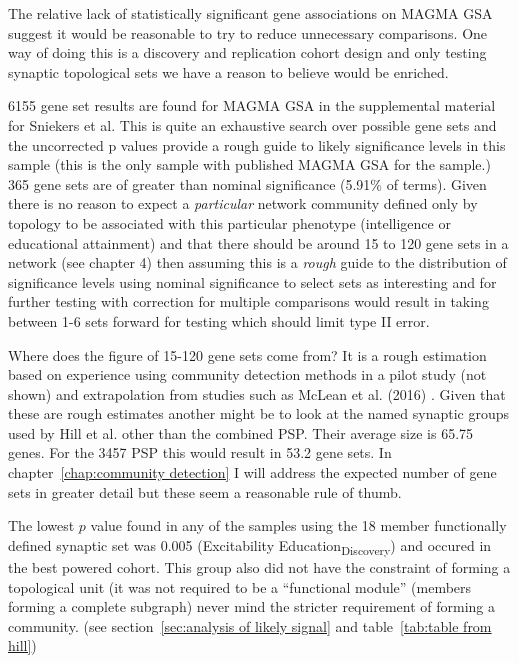 The relative lack of statistically significant gene associations on MAGMA GSA suggest it would be reasonable to try to reduce unnecessary comparisons. One way of doing this is a discovery and replication cohort design and only testing synaptic topological sets we have a reason to believe would be enriched. 

6155 gene set results are found for MAGMA GSA in the supplemental material for Sniekers et al\cite{sniekers2017genome}. This is quite an exhaustive search over possible gene sets and the uncorrected p values provide a rough guide to likely significance levels in this sample (this is the only sample with published MAGMA GSA for the sample.) 365 gene sets are of greater than nominal significance (5.91\% of terms). Given there is no reason to expect a \textit{particular} network community defined only by topology to be associated with this particular phenotype (intelligence or educational attainment) and that there should be around 15 to 120 gene sets in a network (see chapter 4) then assuming this is a \textit{rough} guide to the distribution of significance levels using nominal significance to select sets as interesting and for further testing with correction for multiple comparisons would result in taking between 1-6 sets forward for testing which should limit type II error. 

Where does the figure of 15-120 gene sets come from? It is a rough estimation based on experience using community detection methods in a pilot study (not shown) and extrapolation from studies such as McLean et al. (2016) \cite{mclean2016improved}. Given that these are rough estimates another might be to look at the named synaptic groups used by Hill et al.\cite{hill2014human} other than the combined PSP.  Their average size is 65.75 genes. For the 3457 PSP this would result in 53.2 gene sets. In chapter~\ref{chap:community detection} I will address the expected number of gene sets in greater detail but these seem a reasonable rule of thumb. 

The lowest $p$ value found in any of the samples using the 18 member functionally defined synaptic set was 0.005 (Excitability Education\textsubscript{Discovery}) and occured in the best powered cohort. This group also did not have the constraint of forming a topological unit (it was not required to be a ``functional module'' (members forming a complete subgraph) never mind the stricter requirement of forming a community. (see section~\ref{sec:analysis of likely signal} and table~\ref{tab:table from hill})

